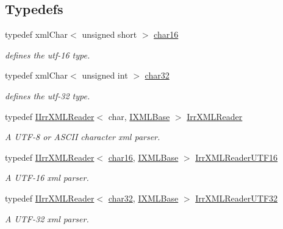 \subsection*{Typedefs}
\begin{DoxyCompactItemize}
\item 
typedef xml\+Char$<$ unsigned short $>$ \hyperlink{namespaceirr_1_1io_afcc06f885f299b3df6cacd15fbe0499a}{char16}
\begin{DoxyCompactList}\small\item\em defines the utf-\/16 type. \end{DoxyCompactList}\item 
typedef xml\+Char$<$ unsigned int $>$ \hyperlink{namespaceirr_1_1io_ae3a0c616a13e7b98b0f83e187f4f4a60}{char32}
\begin{DoxyCompactList}\small\item\em defines the utf-\/32 type. \end{DoxyCompactList}\item 
typedef \hyperlink{classirr_1_1io_1_1IIrrXMLReader}{I\+Irr\+X\+M\+L\+Reader}$<$ char, \hyperlink{classirr_1_1io_1_1IXMLBase}{I\+X\+M\+L\+Base} $>$ \hyperlink{namespaceirr_1_1io_a682f8a2c4c57259bfde1ec8fa27a565b}{Irr\+X\+M\+L\+Reader}
\begin{DoxyCompactList}\small\item\em A U\+T\+F-\/8 or A\+S\+C\+II character xml parser. \end{DoxyCompactList}\item 
typedef \hyperlink{classirr_1_1io_1_1IIrrXMLReader}{I\+Irr\+X\+M\+L\+Reader}$<$ \hyperlink{namespaceirr_1_1io_afcc06f885f299b3df6cacd15fbe0499a}{char16}, \hyperlink{classirr_1_1io_1_1IXMLBase}{I\+X\+M\+L\+Base} $>$ \hyperlink{namespaceirr_1_1io_a76b498bd6edceb2e2ef91d75585e6bfd}{Irr\+X\+M\+L\+Reader\+U\+T\+F16}
\begin{DoxyCompactList}\small\item\em A U\+T\+F-\/16 xml parser. \end{DoxyCompactList}\item 
typedef \hyperlink{classirr_1_1io_1_1IIrrXMLReader}{I\+Irr\+X\+M\+L\+Reader}$<$ \hyperlink{namespaceirr_1_1io_ae3a0c616a13e7b98b0f83e187f4f4a60}{char32}, \hyperlink{classirr_1_1io_1_1IXMLBase}{I\+X\+M\+L\+Base} $>$ \hyperlink{namespaceirr_1_1io_aa596f324a302585d965b1a28c562561b}{Irr\+X\+M\+L\+Reader\+U\+T\+F32}
\begin{DoxyCompactList}\small\item\em A U\+T\+F-\/32 xml parser. \end{DoxyCompactList}\item 

\end{DoxyCompactItemize}
